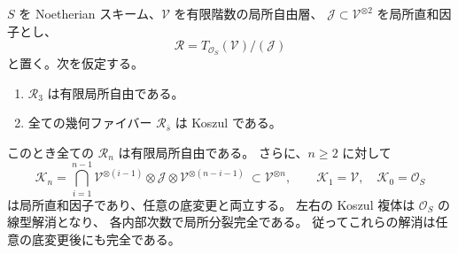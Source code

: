 \begin{lemma}
\label{lem:relative-koszul-degree-three}
$S$ を Noetherian スキーム、$\mathcal V$ を有限階数の局所自由層、
$\mathcal J\subset\mathcal V^{\otimes2}$ を局所直和因子とし、
\[
 \mathcal R=T_{\mathcal O_S}(\mathcal V)/(\mathcal J)
\]
と置く。次を仮定する。
\begin{enumerate}
\item $\mathcal R_3$ は有限局所自由である。
\item 全ての幾何ファイバー $\mathcal R_{\bar s}$ は Koszul である。
\end{enumerate}
このとき全ての $\mathcal R_n$ は有限局所自由である。
さらに、$n\ge2$ に対して
\[
 \mathcal K_n=
 \bigcap_{i=1}^{n-1}
 \mathcal V^{\otimes(i-1)}\otimes\mathcal J
       \otimes\mathcal V^{\otimes(n-i-1)}
 \ \subset\mathcal V^{\otimes n},
 \qquad
 \mathcal K_1=\mathcal V,\quad \mathcal K_0=\mathcal O_S
\]
は局所直和因子であり、任意の底変更と両立する。
左右の Koszul 複体は $\mathcal O_S$ の線型解消となり、
各内部次数で局所分裂完全である。
従ってこれらの解消は任意の底変更後にも完全である。
\end{lemma}
